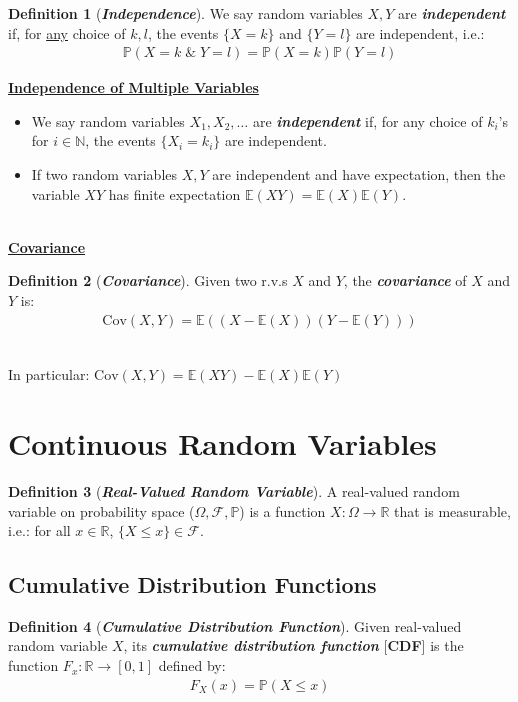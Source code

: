 \documentclass[12pt]{extarticle}
\newcommand{\pstart}[0]{\noindent}
\newcommand{\newp}[0]{~\\\pstart}
\newcommand{\term}[1]{\textbf{\textit{#1}}}
\newcommand{\titleul}[1]{\pstart\textbf{\ul{#1}}}
\theoremstyle{definition}
\newtheorem*{definition}{Definition}
\theoremstyle{remark}
\newcommand{\prob}[1]{\mathbb{P}\left(#1\right)}
\newcommand{\expected}[1]{\mathbb{E}\left(#1\right)}
\newcommand{\covariance}[2]{\text{Cov}\left(#1,#2\right)}
\begin{document}
\begin{tcolorbox}[colback=red!60!yellow!15!white]
    \begin{definition}[\term{Independence}]
        We say random variables $X,Y$ are \term{independent} if, for 
\ul{any} choice of $k,l$, the events $\{X=k\}$ and $\{Y=l\}$ are 
independent, i.e.: \begin{align*}
            \prob{X=k\;\&\;Y=l}=\prob{X=k}\prob{Y=l}
        \end{align*}
    \end{definition}    
\end{tcolorbox}

\vspace{5pt}
\titleul{Independence of Multiple Variables}
\begin{itemize}
    \item We say random variables $X_1,X_2,\hdots$ are \term{independent} 
if, for any choice of $k_i$'s for $i\in\mathbb{N}$, the events 
$\{X_i=k_i\}$ are independent.
    \item If two random variables $X,Y$ are independent and have 
expectation, then the variable $XY$ has finite expectation 
$\expected{XY}=\expected{X}\expected{Y}$.
\end{itemize}

\newp
\titleul{Covariance}
\begin{definition}[\term{Covariance}]
    Given two r.v.s $X$ and $Y$, the \term{covariance} of $X$ and $Y$ is: 
\begin{align*}
        \covariance{X}{Y}=\expected{(X-\expected{X})(Y-\expected{Y})}
    \end{align*}
\end{definition}

\newp
In particular: $\covariance{X}{Y}=\expected{XY}-\expected{X}\expected{Y}$

\pagebreak
\section{Continuous Random Variables}
\begin{definition}[\term{Real-Valued Random Variable}]
    A real-valued random variable on probability space 
($\Omega,\mathcal{F},\mathbb{P}$) is a function $X:\Omega\to\mathbb{R}$ 
that is measurable, i.e.: for all $x\in\mathbb{R}$, $\{X\leq 
x\}\in\mathcal{F}$.
\end{definition}

\subsection{Cumulative Distribution Functions}
\begin{tcolorbox}[colback=blue!70!green!15!white]
    \begin{definition}[\term{Cumulative Distribution Function}]
        Given real-valued random variable $X$, its \term{cumulative 
distribution function} [\textbf{CDF}] is the function 
$F_x:\mathbb{R}\to[0,1]$ defined by: \begin{align*}
            F_X(x)=\prob{X\leq x}
        \end{align*}
    \end{definition}
\end{tcolorbox}
\end{document}
